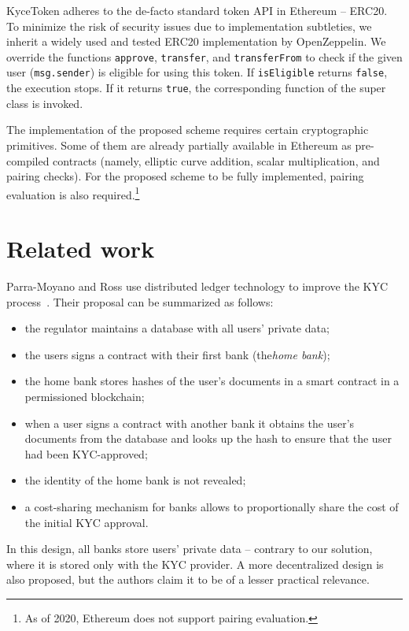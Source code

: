 KyceToken adheres to the de-facto standard token API in Ethereum -- ERC20.
To minimize the risk of security issues due to implementation subtleties, we inherit a widely used and tested ERC20 implementation by OpenZeppelin.
We override the functions \texttt{approve}, \texttt{transfer}, and \texttt{transferFrom} to check if the given user (\texttt{msg.sender}) is eligible for using this token.
If \texttt{isEligible} returns \texttt{false}, the execution stops.
If it returns \texttt{true}, the corresponding function of the super class is invoked.

The implementation of the proposed scheme requires certain cryptographic primitives.
Some of them are already partially available in Ethereum as pre-compiled contracts (namely, elliptic curve addition, scalar multiplication, and pairing checks).
For the proposed scheme to be fully implemented, pairing evaluation is also required.\footnote{As of 2020, Ethereum does not support pairing evaluation.}



\section{Related work}

Parra-Moyano and Ross use distributed ledger technology to improve the KYC process~\cite{Moyano2017}.
Their proposal can be summarized as follows:
\begin{itemize}
	\item the regulator maintains a database with all users' private data;
	\item the users signs a contract with their first bank (the\textit{home bank});
	\item the home bank stores hashes of the user's documents in a smart contract in a permissioned blockchain;
	\item when a user signs a contract with another bank it obtains the user's documents from the database and looks up the hash to ensure that the user had been KYC-approved;
	\item the identity of the home bank is not revealed;
	\item a cost-sharing mechanism for banks allows to proportionally share the cost of the initial KYC approval.
\end{itemize}
In this design, all banks store users' private data -- contrary to our solution, where it is stored only with the KYC provider.
A more decentralized design is also proposed, but the authors claim it to be of a lesser practical relevance.

